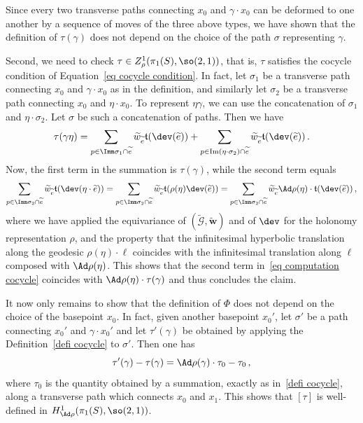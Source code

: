 Since every two transverse paths connecting $x_0$ and $\gamma\cdot x_0$ can be deformed to one another by a sequence of moves of the three above types, we have shown that the definition of $\tau(\gamma)$ does not depend on the choice of the path $\sigma$ representing $\gamma$.

Second, we need to check $\tau\in Z^1_\rho(\pi_1(S),\so(2,1))$, that is, $\tau$ satisfies the cocycle condition of Equation~\eqref{eq cocycle condition}. In fact, let $\sigma_1$ be a transverse path connecting $x_0$ and $\gamma\cdot x_0$ as in the definition, and similarly let $\sigma_2$ be a transverse path connecting $x_0$ and $\eta\cdot x_0$. To represent $\eta\gamma$, we can use the concatenation of $\sigma_1$ and $\eta\cdot \sigma_2$. Let $\sigma$ be such a concatenation of paths. Then we have
\begin{equation}\label{eq computation cocycle}
\tau(\gamma\eta)=\sum_{p\in \Imm\sigma_1\cap \widetilde e} \widetilde w_{\widetilde e} \mathfrak t(\dev(\widetilde e))+\sum_{p\in \mathrm{Im}(\eta\cdot\sigma_2)\cap \widetilde e} \widetilde w_{\widetilde e} \mathfrak t(\dev(\widetilde e))\,.
\end{equation}
Now, the first term in the summation is $\tau(\gamma)$, while the second term equals
\[
\sum_{p\in \Imm\sigma_2\cap \widetilde e} \widetilde w_{\widetilde e} \mathfrak t(\dev(\eta\cdot\widetilde e))=\sum_{p\in \Imm\sigma_2\cap \widetilde e} \widetilde w_{\widetilde e} \mathfrak t(\rho(\eta)\dev(\widetilde e))=\sum_{p\in \Imm\sigma_2\cap \widetilde e} \widetilde w_{\widetilde e} \Ad\rho(\eta)\cdot\mathfrak t(\dev(\widetilde e))\,,
\]
where we have applied the equivariance of $(\widetilde{\mathcal{G}},\widetilde{\mathbf w})$ and of $\dev$ for the holonomy representation $\rho$, and the property that the infinitesimal hyperbolic translation along the geodesic $\rho(\eta)\cdot \ell$ coincides with the infinitesimal translation along $\ell$ composed with $\Ad\rho(\eta)$. This shows that the second term in~\eqref{eq computation cocycle} coincides with $\Ad\rho(\eta)\cdot \tau(\gamma)$ and thus concludes the claim.

It now only remains to show that the definition of $\Phi$ does not depend on the choice of the basepoint $x_0$. In fact, given another basepoint $x_0'$, let $\sigma'$ be a path connecting $x_0'$ and $\gamma\cdot x_0'$ and let $\tau'(\gamma)$ be obtained by applying the Definition~\eqref{defi cocycle} to $\sigma'$. Then one has
\[
\tau'(\gamma)-\tau(\gamma)=\Ad\rho(\gamma)\cdot \tau_0-\tau_0\,,
\]
where $\tau_0$ is the quantity obtained by a summation, exactly as in~\eqref{defi cocycle}, along a transverse path which connects $x_0$ and $x_1$. This shows that $[\tau]$ is well-defined in $H^1_{\Ad\rho}(\pi_1(S),\so(2,1))$.


